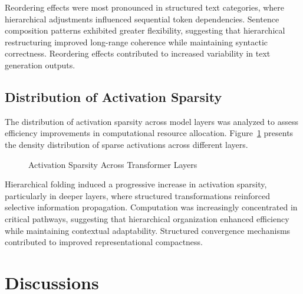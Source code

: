 \documentclass[5p,times]{elsarticle}
\begin{document}
Reordering effects were most pronounced in structured text categories, where hierarchical adjustments influenced sequential token dependencies. Sentence composition patterns exhibited greater flexibility, suggesting that hierarchical restructuring improved long-range coherence while maintaining syntactic correctness. Reordering effects contributed to increased variability in text generation outputs.

\subsection{Distribution of Activation Sparsity}

The distribution of activation sparsity across model layers was analyzed to assess efficiency improvements in computational resource allocation. Figure~\ref{fig:sparsity_distribution} presents the density distribution of sparse activations across different layers.

\begin{figure}[h]
	\centering
	\caption{Activation Sparsity Across Transformer Layers}
	\label{fig:sparsity_distribution}
\end{figure}

Hierarchical folding induced a progressive increase in activation sparsity, particularly in deeper layers, where structured transformations reinforced selective information propagation. Computation was increasingly concentrated in critical pathways, suggesting that hierarchical organization enhanced efficiency while maintaining contextual adaptability. Structured convergence mechanisms contributed to improved representational compactness.


\section{Discussions}
\end{document}
